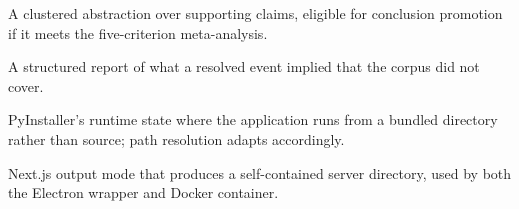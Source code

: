 \documentclass[11pt,letterpaper]{article}
\begin{document}
\begin{description}[leftmargin=3.2cm,labelwidth=3cm,labelsep=0.2cm,font=\bfseries]
\item[Principle] A clustered abstraction over supporting claims, eligible for conclusion promotion if it meets the five-criterion meta-analysis.
\item[Blindspot] A structured report of what a resolved event implied that the corpus did not cover.
\item[Frozen Mode] PyInstaller's runtime state where the application runs from a bundled directory rather than source; path resolution adapts accordingly.
\item[Standalone Build] Next.js output mode that produces a self-contained server directory, used by both the Electron wrapper and Docker container.
\end{description}
\end{document}
